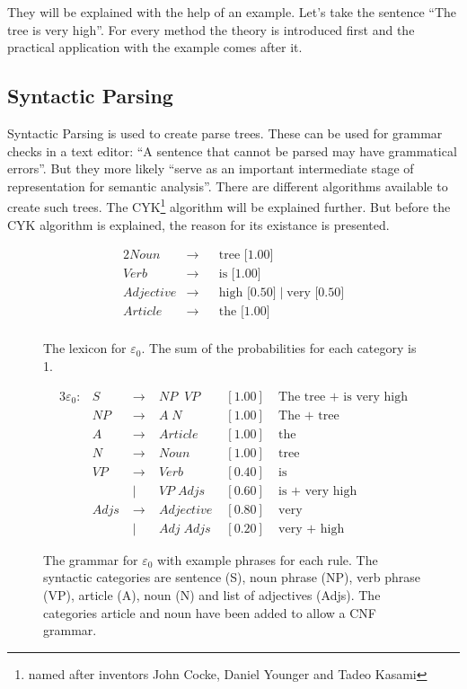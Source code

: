\documentclass[12pt,twoside]{scrartcl}
\theoremstyle{plain}
\theoremstyle{definition}
\theoremstyle{remark}
\begin{document}
	They will be explained with the help of an example. Let's take the sentence ``The tree is very high''. For every method the theory is introduced first and the practical application with the example comes after it.
	
	\subsection{Syntactic Parsing}
	\label{subSec:syntacticParsing}
		Syntactic Parsing is used to create parse trees. These can be used for grammar checks in a text editor: ``A sentence that cannot be parsed may have grammatical errors''\cite[p.~461]{Jurafsky2009b}. But they more likely ``serve as an important intermediate stage of representation for semantic analysis''\cite[p.~461]{Jurafsky2009b}. There are different algorithms available to create such trees. The CYK\footnote{named after inventors John Cocke, Daniel Younger and Tadeo Kasami\cite[p.~893]{Russel2010}} algorithm will be explained further. But before the CYK algorithm is explained, the reason for its existance is presented.
		
		\begin{figure}
			\begin{alignat*}{2}
				Noun &\rightarrow && \text{tree [1.00]} \\
				Verb &\rightarrow && \text{is [1.00]} \\
				Adjective &\rightarrow && \text{high [0.50]} \;|\; \text{very [0.50]} \\
				Article &\rightarrow && \text{the [1.00]} \\
			\end{alignat*}
			\caption{The lexicon for $\varepsilon_{0}$. The sum of the probabilities for each category is 1.}
			\label{fig:lexicon}
		\end{figure}
		
		\begin{figure}
			\begin{alignat*}{3}
				\varepsilon_{0}:& S \;&\rightarrow &\; NP\;\;VP \;&[1.00]&\; \text{The tree + is very high} \\
				& NP \;&\rightarrow &\; A\;N \;&[1.00]&\; \text{The + tree}\\
				& A \;&\rightarrow &\; Article\;&[1.00]&\; \text{the}\\
				& N \;&\rightarrow &\; Noun\;&[1.00]&\; \text{tree}\\
				& VP \;&\rightarrow &\; Verb \;&[0.40]&\; \text{is} \\
				& \;&|&\; VP\;Adjs \;&[0.60]&\; \text{is + very high} \\
				& Adjs \;&\rightarrow &\; Adjective \;&[0.80]&\; \text{very} \\
				& \;&|&\; Adj\;Adjs \;&[0.20]&\; \text{very + high}
			\end{alignat*}
		
			\caption{The grammar for $\varepsilon_{0}$ with example phrases for each rule. The syntactic categories are sentence (S), noun phrase (NP), verb phrase (VP), article (A), noun (N) and list of adjectives (Adjs). The categories article and noun have been added to allow a CNF grammar.}
			\label{fig:grammar}
		\end{figure}
		
\end{document}
